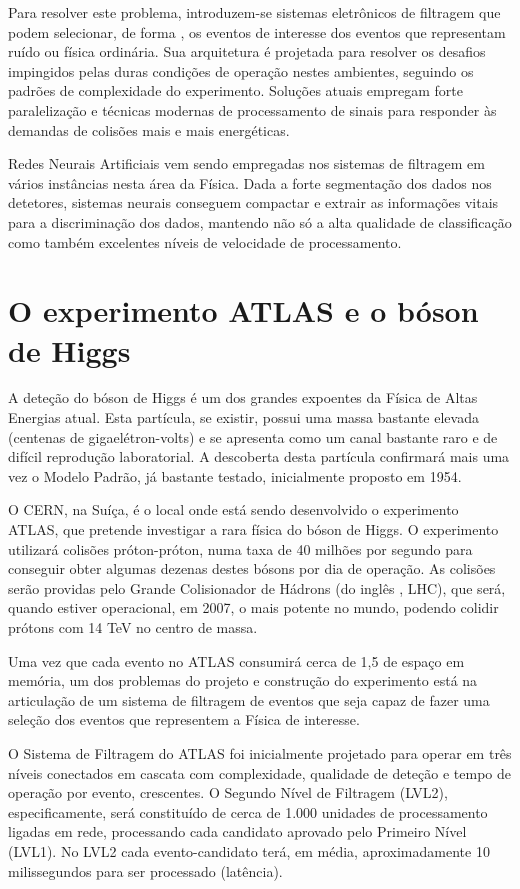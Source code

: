 Para resolver este problema, introduzem-se sistemas eletrônicos de filtragem
que podem selecionar, de forma , os eventos de interesse dos
eventos que representam ruído ou física ordinária. Sua arquitetura é projetada
para resolver os desafios impingidos pelas duras condições de operação nestes
ambientes, seguindo os padrões de complexidade do experimento. Soluções atuais
empregam forte paralelização e técnicas modernas de processamento de sinais
para responder às demandas de colisões mais e mais energéticas.

Redes Neurais Artificiais vem sendo empregadas nos sistemas de filtragem em
vários instâncias nesta área da Física. Dada a forte segmentação dos dados nos
detetores, sistemas neurais conseguem compactar e extrair as informações
vitais para a discriminação dos dados, mantendo não só a alta qualidade de
classificação como também excelentes níveis de velocidade de processamento.

\section{O experimento ATLAS e o bóson de Higgs}

A deteção do bóson de Higgs é um dos grandes expoentes da Física de Altas
Energias atual. Esta partícula, se existir, possui uma massa bastante elevada
(centenas de gigaelétron-volts) e se apresenta como um canal bastante raro e
de difícil reprodução laboratorial. A descoberta desta partícula confirmará
mais uma vez o Modelo Padrão, já bastante testado, inicialmente proposto em
1954.

O CERN, na Suíça, é o local onde está sendo desenvolvido o experimento ATLAS,
que pretende investigar a rara física do bóson de Higgs. O experimento
utilizará colisões próton-próton, numa taxa de 40 milhões por segundo para
conseguir obter algumas dezenas destes bósons por dia de operação. As colisões
serão providas pelo Grande Colisionador de Hádrons (do inglês , LHC), que será, quando estiver operacional, em 2007, o mais
potente no mundo, podendo colidir prótons com 14 TeV no centro de massa.

Uma vez que cada evento no ATLAS consumirá cerca de 1,5  de
espaço em memória, um dos problemas do projeto e construção do experimento
está na articulação de um sistema de filtragem de eventos que seja capaz de
fazer uma seleção  dos eventos que representem a Física de
interesse.

O Sistema de Filtragem do ATLAS foi inicialmente projetado para operar em três
níveis conectados em cascata com complexidade, qualidade de deteção e tempo de
operação por evento, crescentes. O Segundo Nível de Filtragem (LVL2),
especificamente, será constituído de cerca de 1.000 unidades de processamento
ligadas em rede, processando cada candidato aprovado pelo Primeiro Nível
(LVL1). No LVL2 cada evento-candidato terá, em média, aproximadamente 10
milissegundos para ser processado (latência).

